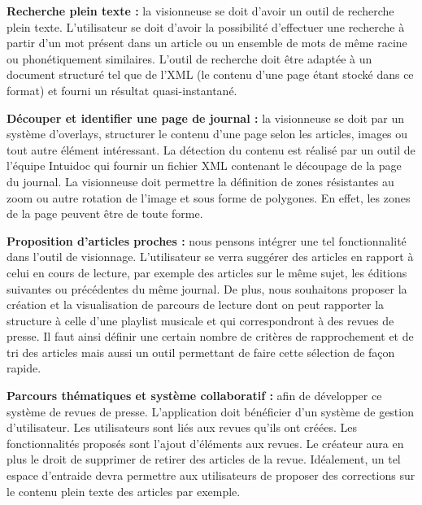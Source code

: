 	\textbf{Recherche plein texte :} la visionneuse se doit d’avoir un outil de recherche plein texte. L’utilisateur se doit d’avoir la possibilité d’effectuer une recherche à partir d’un mot présent dans un article ou un ensemble de mots de même racine ou phonétiquement similaires. %
	L’outil de recherche doit être adaptée à un document structuré tel que de l’XML (le contenu d’une page étant stocké dans ce format) et fourni un résultat quasi-instantané. %
	

	\textbf{Découper et identifier une page de journal :} la visionneuse se doit par un système d’overlays, structurer le contenu d’une page selon les articles, images ou tout autre élément intéressant. La détection du contenu est réalisé par un outil de l’équipe Intuidoc qui fournir un fichier XML contenant le découpage de la page du journal. La visionneuse doit permettre la définition de zones résistantes au zoom ou autre rotation de l’image et sous forme de polygones. En effet, les zones de la page peuvent être de toute forme.


	\textbf{Proposition d’articles proches :} nous pensons intégrer une tel fonctionnalité dans l’outil de visionnage. L'utilisateur se verra suggérer des articles en rapport à celui en cours de lecture, par exemple des articles sur le même sujet, les éditions suivantes ou précédentes du même journal. De plus, nous souhaitons proposer la création et la visualisation de parcours de lecture dont on peut rapporter la structure à celle d’une playlist musicale et qui correspondront à des revues de presse. Il faut ainsi définir une certain nombre de critères de rapprochement et de tri des articles mais aussi un outil permettant de faire cette sélection de façon rapide.
	

	\textbf{Parcours thématiques et système collaboratif :} afin de développer ce système de revues de presse. L’application doit bénéficier d’un système de gestion d’utilisateur. Les utilisateurs sont liés aux revues qu’ils ont créées. Les fonctionnalités proposés sont l’ajout d'éléments aux revues. Le créateur aura en plus le droit de supprimer de retirer des articles de la revue. Idéalement, un tel espace d’entraide devra permettre aux utilisateurs de proposer des corrections sur le contenu plein texte des articles par exemple.